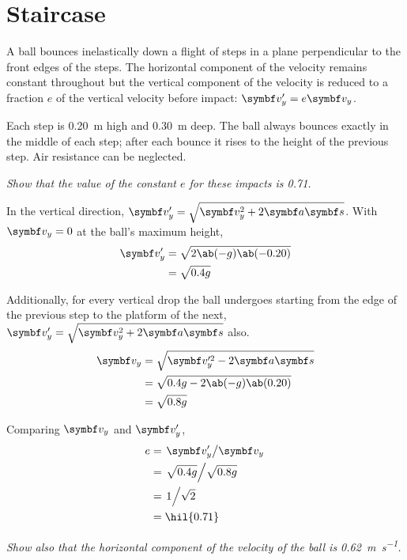 \section{Staircase}
A ball bounces inelastically down a flight of steps in a plane
perpendicular to the front edges of the steps.
The horizontal component of the velocity remains constant throughout
but the vertical component of the velocity is reduced to a fraction
\(e\) of the vertical velocity before impact: \(\mv{v}_y' = e\mv{v}_y\).

Each step is \qty{0.20}{\metre} high and \qty{0.30}{\metre} deep.
The ball always bounces exactly in the middle of each step; after
each bounce it rises to the height of the previous step.
Air resistance can be neglected.

\it{Show that the value of the constant \(e\) for these impacts is \num{0.71}.}

In the vertical direction, \(\mv{v}_y' = \sqrt{\mv{v}_y^2 +
2\mv{a}\mv{s}}\). With \(\mv{v}_y = 0\)
at the ball's maximum height,
\begin{align*}
  \mv{v}_y' &= \sqrt{2\ab(-g)\ab(-0.20)} \\
  &= \sqrt{0.4g}
\end{align*}

Additionally, for every vertical drop the ball undergoes starting
from the edge of the previous
step to the platform of the next, \(\mv{v}_y' = \sqrt{\mv{v}_y^2 +
2\mv{a}\mv{s}}\) also.
\begin{align*}
  \mv{v}_y &= \sqrt{\mv{v}_y'^2 - 2\mv{a}\mv{s}} \\
  &= \sqrt{0.4g - 2\ab(-g)\ab(0.20)} \\
  &= \sqrt{0.8g}
\end{align*}

Comparing \(\mv{v}_y\) and \(\mv{v}_y'\),
\begin{align*}
  e &= \lf{\mv{v}_y'}{\mv{v}_y} \\
  &= \lf{ \sqrt{0.4g} }{ \sqrt{0.8g} } \\
  &= \lf{1}{ \sqrt{2} } \\
  &= \hil{0.71}
\end{align*}

\it{Show also that the horizontal component of the velocity of the
ball is \qty{0.62}{\metre\per\second}.}

